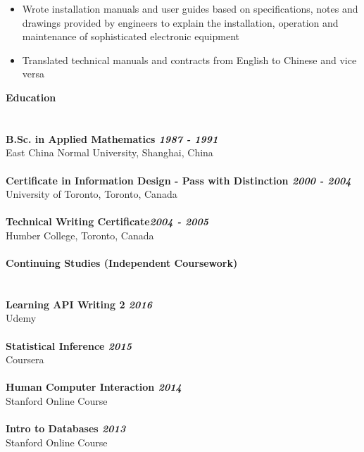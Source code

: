 \documentclass[11pt]{extarticle}
\begin{document}
\begin {itemize}
\setlength{\itemsep}{0pt}
\item Wrote installation manuals and user guides based on specifications, notes and drawings provided by engineers to explain the installation, operation and maintenance of sophisticated electronic equipment 
\item Translated technical manuals and contracts from English to Chinese and vice versa\\
\end{itemize}
{\large \bf Education} \\ 
\underline{\hspace{6.55in}} \\
\\
{\bf B.Sc. in Applied Mathematics \hfill \it 1987 - 1991} \\
East China Normal University, Shanghai, China \\
\\
{\bf Certificate in Information Design - Pass with Distinction \hfill \it 2000 - 2004} \\
University of Toronto, Toronto, Canada\\
\\
{\bf Technical Writing Certificate\hfill \it 2004 - 2005}\\
 Humber College, Toronto, Canada\\
\\
{\large \bf Continuing Studies (Independent Coursework)} \\ 
\underline{\hspace{6.55in}} \\
\\
{\bf Learning API Writing 2 \hfill \it 2016} \\
Udemy \\
\\
{\bf Statistical Inference \hfill \it 2015}\\
 Coursera\\
\\
{\bf Human Computer Interaction \hfill \it 2014}\\
 Stanford Online Course\\
\\
{\bf Intro to Databases \hfill \it 2013} \\
Stanford  Online Course\\
\\
\end{document}

